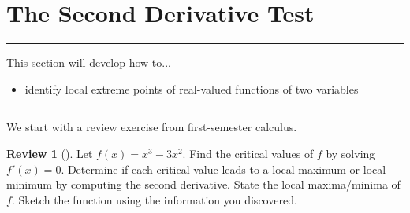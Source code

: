 \documentclass[10pt,]{book}
\theoremstyle{plain}
\theoremstyle{definition}
\theoremstyle{definition}
\theoremstyle{definition}
\newtheorem{project}{Review}[section]
\theoremstyle{definition}
\newenvironment{objectives}[1]{\noindent\rule{\linewidth}{0.1ex}\newline{\textbf{{\large#1}}\par\smallskip}}{\par\noindent\rule{\linewidth}{0.1ex}\par\smallskip}
\theoremstyle{definition}
\numberwithin{equation}{section}
\begin{document}
\section[{The Second Derivative Test}]{The Second Derivative Test}\label{ch10_02_2nd_derivative}
\begin{objectives}{Objectives}\label{objectives-28}
This section will develop how to...%
%
\begin{itemize}[label=\textbullet]
\item{}identify local extreme points of real-valued functions of two variables%
\end{itemize}
\end{objectives}
We start with a review exercise from first-semester calculus.%
\begin{project}[]\label{project-23}
Let \(f(x) = x^3-3x^2\). Find the critical values of \(f\) by solving \(f'(x)=0\). Determine if each critical value leads to a local maximum or local minimum by computing the second derivative. State the local maxima/minima of \(f\). Sketch the function using the information you discovered.%
\end{project}
\typeout{************************************************}
\typeout{************************************************}
\end{document}

